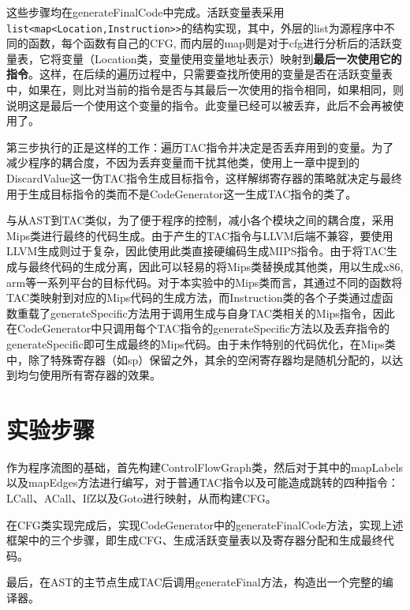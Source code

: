 \documentclass{report}
\begin{document}
\par 这些步骤均在generateFinalCode中完成。活跃变量表采用\lstinline|list<map<Location,Instruction>>|的结构实现，其中，外层的list为源程序中不同的函数，每个函数有自己的CFG, 而内层的map则是对于cfg进行分析后的活跃变量表，它将变量（Location类，变量使用变量地址表示）映射到\textbf{最后一次使用它的指令}。这样，在后续的遍历过程中，只需要查找所使用的变量是否在活跃变量表中，如果在，则比对当前的指令是否与其最后一次使用的指令相同，如果相同，则说明这是最后一个使用这个变量的指令。此变量已经可以被丢弃，此后不会再被使用了。
\par 第三步执行的正是这样的工作：遍历TAC指令并决定是否丢弃用到的变量。为了减少程序的耦合度，不因为丢弃变量而干扰其他类，使用上一章中提到的DiscardValue这一伪TAC指令生成目标指令，这样解绑寄存器的策略就决定与最终用于生成目标指令的类而不是CodeGenerator这一生成TAC指令的类了。
\par 与从AST到TAC类似，为了便于程序的控制，减小各个模块之间的耦合度，采用Mips类进行最终的代码生成。由于产生的TAC指令与LLVM后端不兼容，要使用LLVM生成则过于复杂，因此使用此类直接硬编码生成MIPS指令。由于将TAC生成与最终代码的生成分离，因此可以轻易的将Mips类替换成其他类，用以生成x86, arm等一系列平台的目标代码。对于本实验中的Mips类而言，其通过不同的函数将TAC类映射到对应的Mips代码的生成方法，而Instruction类的各个子类通过虚函数重载了generateSpecific方法用于调用生成与自身TAC类相关的Mips指令，因此在CodeGenerator中只调用每个TAC指令的generateSpecific方法以及丢弃指令的generateSpecific即可生成最终的Mips代码。由于未作特别的代码优化，在Mips类中，除了特殊寄存器（如sp）保留之外，其余的空闲寄存器均是随机分配的，以达到均匀使用所有寄存器的效果。

\section{实验步骤}
\label{sec:shi_yan_bu_zou_4}
\par 作为程序流图的基础，首先构建ControlFlowGraph类，然后对于其中的mapLabels以及mapEdges方法进行编写，对于普通TAC指令以及可能造成跳转的四种指令：LCall、ACall、IfZ以及Goto进行映射，从而构建CFG。
\par 在CFG类实现完成后，实现CodeGenerator中的generateFinalCode方法，实现上述框架中的三个步骤，即生成CFG、生成活跃变量表以及寄存器分配和生成最终代码。
\par 最后，在AST的主节点生成TAC后调用generateFinal方法，构造出一个完整的编译器。
\end{document}

